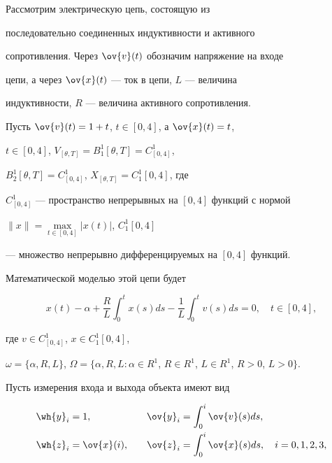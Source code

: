 \begin{exam}


Рассмотрим электрическую цепь, состоящую из


последовательно соединенных индуктивности и активного


сопротивления. Через $\ov{v}(t)$ обозначим напряжение на входе


цепи, а через $\ov{x}(t)$ --- ток в цепи, $L$ --- величина


индуктивности, $R$ --- величина активного сопротивления.





Пусть $\ov{v}(t)=1+t$, $t\in[0,4]$, а $\ov{x}(t)=t$,


$t\in[0,4]$, $V_{[\theta,T]}=B^1_1 [\theta,T]=C^1_{[0,4]}$,


$B^1_2[\theta,T] = C^1_{[0,4]}$, $X_{[\theta,T]}=C^1_1[0,4]$, где


$C^1_{[0,4]}$ --- пространство непрерывных на $[0,4]$ функций с нормой


$\|x\|=\max\limits_{t\in[0,4]}|x(t)|$, $C^1_1[0,4]$


--- множество непрерывно дифференцируемых на $[0,4]$ функций.





Математической моделью этой цепи будет


$$


x(t)-\alpha+\frac{R}{L}\int^t_0 x(s)ds -


\frac{1}{L}\int^t_0 v(s)ds=0, \quad t\in[0,4],


$$


где $v\in C^1_{[0,4]}$, $x\in C^1_1[0,4]$,


$\omega=\{\alpha,R,L\}$, $\Omega=\{\alpha,R,L:\alpha\in R^1$, $R\in


R^1$, $L\in R^1$, $R>0$, $L>0\}$.





Пусть измерения входа и выхода объекта имеют вид 


\begin{alignat*}{2}


\wh{y}_i&=1, &\quad 


\ov{y}_i&=\int^i_0\ov{v}(s)ds,\\


%


\wh{z}_i&=\ov{x}(i), &\quad \ov{z}_i&=


\int^i_0\ov{x}(s)ds, \quad i=0,1,2,3,



\end{alignat*}
\end{exam}
